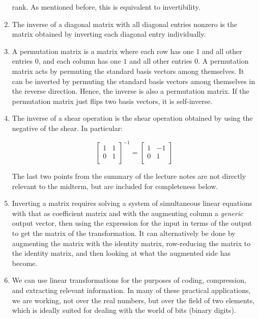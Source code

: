 \documentclass[10pt]{amsart}
\begin{document}
\begin{enumerate}
  rank. As mentioned before, this is equivalent to invertibility.
\item The inverse of a diagonal matrix with all diagonal entries
  nonzero is the matrix obtained by inverting each diagonal entry
  individually.
\item A permutation matrix is a matrix where each row has one $1$ and
  all other entries $0$, and each column has one $1$ and all other
  entries $0$. A permutation matrix acts by permuting the standard
  basis vectors among themselves. It can be inverted by permuting the
  standard basis vectors among themselves in the reverse
  direction. Hence, the inverse is also a permutation matrix. If the
  permutation matrix just flips two basis vectors, it is self-inverse.
\item The inverse of a shear operation is the shear operation obtained
  by using the negative of the shear. In particular:

  $$\left[\begin{matrix} 1 & 1 \\ 0 & 1 \\\end{matrix} \right]^{-1} = \left[\begin{matrix} 1 & -1 \\ 0 & 1 \\\end{matrix}\right]$$

  The last two points from the summary of the lecture notes are not
  directly relevant to the midterm, but are included for completeness
  below.

\item Inverting a matrix requires solving a system of simultaneous
  linear equations with that as coefficient matrix and with the
  augmenting column a {\em generic} output vector, then using the
  expression for the input in terms of the output to get the matrix of
  the transformation. It can alternatively be done by augmenting the
  matrix with the identity matrix, row-reducing the matrix to the
  identity matrix, and then looking at what the augmented side has
  become.
\item We can use linear transformations for the purposes of coding,
  compression, and extracting relevant information. In many of these
  practical applications, we are working, not over the real numbers,
  but over the field of two elements, which is ideally suited for
  dealing with the world of bits (binary digits).
\end{enumerate}
\end{document}
